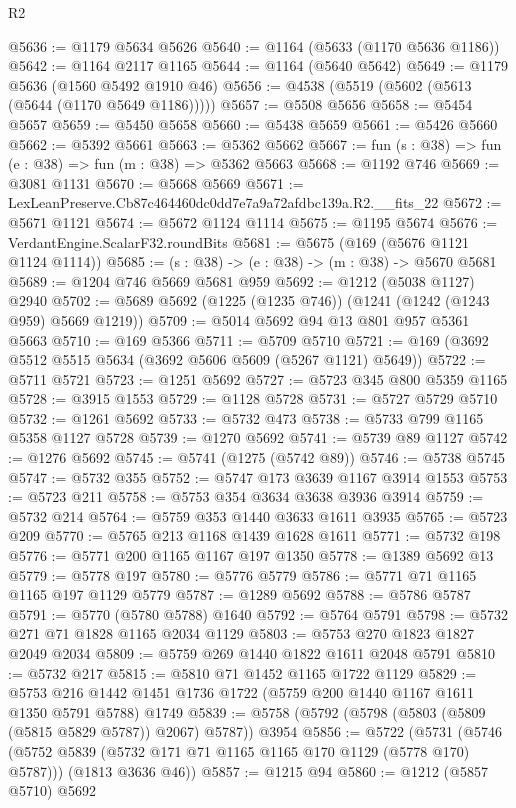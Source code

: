 \begin{lexlean}{R2}
\begin{coremodule}
@5636 := @1179 @5634 @5626
@5640 := @1164 (@5633 (@1170 @5636 @1186))
@5642 := @1164 @2117 @1165
@5644 := @1164 (@5640 @5642)
@5649 := @1179 @5636 (@1560 @5492 @1910 @46)
@5656 := @4538 (@5519 (@5602 (@5613 (@5644 (@1170 @5649 @1186)))))
@5657 := @5508 @5656
@5658 := @5454 @5657
@5659 := @5450 @5658
@5660 := @5438 @5659
@5661 := @5426 @5660
@5662 := @5392 @5661
@5663 := @5362 @5662
@5667 := fun (s : @38) => fun (e : @38) => fun (m : @38) => @5362 @5663
@5668 := @1192 @746
@5669 := @3081 @1131
@5670 := @5668 @5669
@5671 := LexLeanPreserve.Cb87c464460dc0dd7e7a9a72afdbc139a.R2.__fits_22
@5672 := @5671 @1121
@5674 := @5672 @1124 @1114
@5675 := @1195 @5674
@5676 := VerdantEngine.ScalarF32.roundBits
@5681 := @5675 (@169 (@5676 @1121 @1124 @1114))
@5685 := (s : @38) -> (e : @38) -> (m : @38) -> @5670 @5681
@5689 := @1204 @746 @5669 @5681 @959
@5692 := @1212 (@5038 @1127) @2940
@5702 := @5689 @5692 (@1225 (@1235 @746)) (@1241 (@1242 (@1243 @959) @5669 @1219))
@5709 := @5014 @5692 @94 @13 @801 @957 @5361 @5663
@5710 := @169 @5366
@5711 := @5709 @5710
@5721 := @169 (@3692 @5512 @5515 @5634 (@3692 @5606 @5609 (@5267 @1121) @5649))
@5722 := @5711 @5721
@5723 := @1251 @5692
@5727 := @5723 @345 @800 @5359 @1165
@5728 := @3915 @1553
@5729 := @1128 @5728
@5731 := @5727 @5729 @5710
@5732 := @1261 @5692
@5733 := @5732 @473
@5738 := @5733 @799 @1165 @5358 @1127 @5728
@5739 := @1270 @5692
@5741 := @5739 @89 @1127
@5742 := @1276 @5692
@5745 := @5741 (@1275 (@5742 @89))
@5746 := @5738 @5745
@5747 := @5732 @355
@5752 := @5747 @173 @3639 @1167 @3914 @1553
@5753 := @5723 @211
@5758 := @5753 @354 @3634 @3638 @3936 @3914
@5759 := @5732 @214
@5764 := @5759 @353 @1440 @3633 @1611 @3935
@5765 := @5723 @209
@5770 := @5765 @213 @1168 @1439 @1628 @1611
@5771 := @5732 @198
@5776 := @5771 @200 @1165 @1167 @197 @1350
@5778 := @1389 @5692 @13
@5779 := @5778 @197
@5780 := @5776 @5779
@5786 := @5771 @71 @1165 @1165 @197 @1129 @5779
@5787 := @1289 @5692
@5788 := @5786 @5787
@5791 := @5770 (@5780 @5788) @1640
@5792 := @5764 @5791
@5798 := @5732 @271 @71 @1828 @1165 @2034 @1129
@5803 := @5753 @270 @1823 @1827 @2049 @2034
@5809 := @5759 @269 @1440 @1822 @1611 @2048 @5791
@5810 := @5732 @217
@5815 := @5810 @71 @1452 @1165 @1722 @1129
@5829 := @5753 @216 @1442 @1451 @1736 @1722 (@5759 @200 @1440 @1167 @1611 @1350 @5791 @5788) @1749
@5839 := @5758 (@5792 (@5798 (@5803 (@5809 (@5815 @5829 @5787)) @2067) @5787)) @3954
@5856 := @5722
    (@5731
      (@5746 (@5752 @5839 (@5732 @171 @71 @1165 @1165 @170 @1129 (@5778 @170) @5787)))
      (@1813 @3636 @46))
@5857 := @1215 @94
@5860 := @1212 (@5857 @5710) @5692

\end{coremodule}
\end{lexlean}
